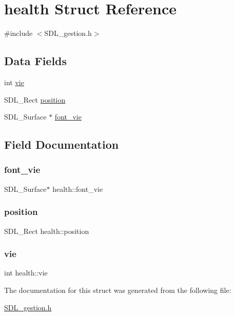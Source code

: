 \hypertarget{structhealth}{}\section{health Struct Reference}
\label{structhealth}


{\ttfamily \#include $<$S\+D\+L\+\_\+gestion.\+h$>$}

\subsection*{Data Fields}
\begin{DoxyCompactItemize}
\item 
int \mbox{\hyperlink{structhealth_a36996f3ec647d394ac9eb41eed3d2f63}{vie}}
\item 
S\+D\+L\+\_\+\+Rect \mbox{\hyperlink{structhealth_a08a6de67cbfb3165638a53258fad3a57}{position}}
\item 
S\+D\+L\+\_\+\+Surface $\ast$ \mbox{\hyperlink{structhealth_a243fe344f539db773eed5a8c5d0e62a1}{font\+\_\+vie}}
\end{DoxyCompactItemize}


\subsection{Field Documentation}
\mbox{\label{structhealth_a243fe344f539db773eed5a8c5d0e62a1}} 
\subsubsection{\texorpdfstring{font\_vie}{font\_vie}}
{\footnotesize\ttfamily S\+D\+L\+\_\+\+Surface$\ast$ health\+::font\+\_\+vie}

\mbox{\label{structhealth_a08a6de67cbfb3165638a53258fad3a57}} 
\subsubsection{\texorpdfstring{position}{position}}
{\footnotesize\ttfamily S\+D\+L\+\_\+\+Rect health\+::position}

\mbox{\label{structhealth_a36996f3ec647d394ac9eb41eed3d2f63}} 
\subsubsection{\texorpdfstring{vie}{vie}}
{\footnotesize\ttfamily int health\+::vie}



The documentation for this struct was generated from the following file\+:\begin{DoxyCompactItemize}
\item 
\mbox{\hyperlink{SDL__gestion_8h}{S\+D\+L\+\_\+gestion.\+h}}\end{DoxyCompactItemize}
